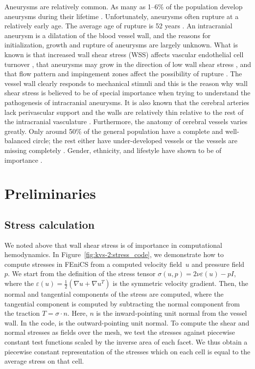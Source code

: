 Aneurysms are relatively common. As many as 1--6\% of the population
develop aneurysms during their
lifetime \citep{Weir2002}. Unfortunately, aneurysms often rupture at a
relatively early age. The average age of rupture is 52
years \citep{Humphrey2001}. An intracranial aneurysm is a dilatation
of the blood vessel wall, and the reasons for initialization, growth
and rupture of aneurysms are largely unknown.  What is known is that
increased wall shear stress (WSS) affects vascular endothelial cell
turnover \citep{DAVIESREMUZZIGORDONEtAl1986}, that aneurysms may grow
in the direction of low wall shear
stress \citep{BousselRayzMcCullochEtAl2008}, and that flow pattern and
impingement zones affect the possibility of
rupture \citep{CebralCastroBurgessEtAl2005}. The vessel wall clearly
responds to mechanical stimuli and this is the reason why wall shear
stress is believed to be of special importance when trying to
understand the pathogenesis of intracranial aneurysms. It is also
known that the cerebral arteries lack perivascular support and the
walls are relatively thin relative to the rest of the intracranial
vasculature \citep{Humphrey2001,Stehbens1975}.  Furthermore, the
anatomy of cerebral vessels varies greatly. Only around 50\% of the
general population have a complete and well-balanced circle; the rest
either have under-developed vessels or the vessels are missing
completely \citep{Fung1984}. Gender, ethnicity, and lifestyle have
shown to be of
importance \citep{MhurchuAndersonJamrozikEtAl2001,LongstrethNelsonKoepsellEtAl1994,KongableLanzinoGermansonEtAl1996}.

\section{Preliminaries}

\subsection{Stress calculation}

We noted above that wall shear stress is of importance in
computational hemodynamics. In Figure~\ref{fig:kvs-2:stress_code}, we
demonstrate how to compute stresses in FEniCS from a computed velocity
field~$u$ and pressure field~$p$. We start from the definition of the
stress tensor $\sigma(u,p) = 2 \nu \varepsilon (u) - p I$, where the
$\varepsilon(u) = \frac{1}{2}(\nabla u + \nabla u^T)$ is the symmetric
velocity gradient. Then, the normal and tangential components of the
stress are computed, where the tangential component is computed by
subtracting the normal component from the traction $T = \sigma \cdot
n$. Here, $n$ is the inward-pointing unit normal from the vessel
wall. In the code,  is the outward-pointing unit normal. To
compute the shear and normal stresses as fields over the mesh, we test
the stresses against piecewise constant test functions scaled by the
inverse area of each facet. We thus obtain a piecewise constant
representation of the stresses which on each cell is equal to the
average stress on that cell.

